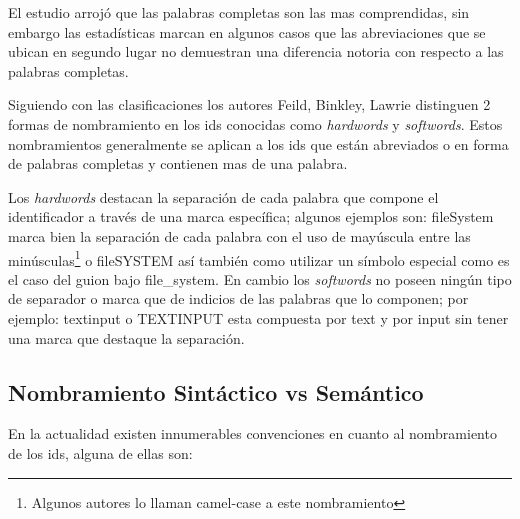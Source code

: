 \documentclass[12pt]{report}
\begin{document}
El estudio arrojó que las palabras completas son las mas comprendidas, sin embargo las estadísticas marcan en algunos casos que las abreviaciones que se ubican en segundo lugar no demuestran una diferencia notoria con respecto a las palabras completas\cite{DCHD06}.

Siguiendo con las clasificaciones los autores Feild, Binkley, Lawrie \cite{FBL06,HDD06,DMDJ13} distinguen 2 formas de nombramiento en los ids conocidas como \textit{hardwords} y \textit{softwords}. Estos nombramientos generalmente se aplican a los ids que están abreviados o en forma de palabras completas y contienen mas de una palabra.

Los \textit{hardwords} destacan la separación de cada palabra que compone el identificador a través de una marca específica; algunos ejemplos son: \textsf{fileSystem} marca bien la separación de cada palabra con el uso de mayúscula entre las minúsculas\footnote[2]{Algunos autores lo llaman camel-case a este nombramiento} o \textsf{fileSYSTEM} así también como utilizar un símbolo especial como es el caso del guion bajo \textsf{file\_system}. En cambio los \textit{softwords} no poseen ningún tipo de separador o marca que de indicios de las palabras que lo componen; por ejemplo: \textsf{textinput} o \textsf{TEXTINPUT} esta compuesta por \textsf{text} y por \textsf{input} sin tener una marca que destaque la separación.




\subsection{Nombramiento Sintáctico vs Semántico}
En la actualidad existen innumerables convenciones en cuanto al nombramiento de los ids, alguna de ellas son:
\end{document}
